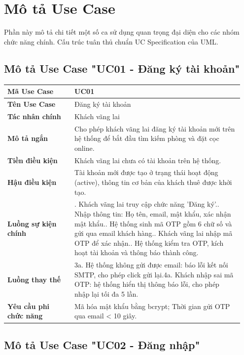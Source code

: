 \section{Mô tả Use Case}

Phần này mô tả chi tiết một số ca sử dụng quan trọng đại diện cho các
nhóm chức năng chính. Cấu trúc tuân thủ chuẩn UC Specification của UML.

\subsection{Mô tả Use Case "UC01 - Đăng ký tài khoản"}

\begin{longtable}[]{@{}>{\RaggedRight\arraybackslash}p{0.27\linewidth}>{\RaggedRight\arraybackslash}p{0.68\linewidth}@{}}
\toprule
\textbf{Mã Use Case} & UC01\tabularnewline
\midrule
\endhead
\textbf{Tên Use Case} & Đăng ký tài khoản\tabularnewline
\textbf{Tác nhân chính} & Khách vãng lai\tabularnewline
\textbf{Mô tả ngắn} & Cho phép khách vãng lai đăng ký tài khoản mới trên
hệ thống để bắt đầu tìm kiếm phòng và đặt cọc online.\tabularnewline
\textbf{Tiền điều kiện} & Khách vãng lai chưa có tài khoản trên hệ
thống.\tabularnewline
\textbf{Hậu điều kiện} & Tài khoản mới được tạo ở trạng thái hoạt động
(active), thông tin cơ bản của khách thuê được khởi tạo.\tabularnewline
\textbf{Luồng sự kiện chính} & 1. Khách vãng lai truy
cập chức năng 'Đăng ký'.\newline 2. Nhập thông tin: Họ tên, email,
mật khẩu, xác nhận mật khẩu.\newline 3. Hệ thống sinh mã OTP gồm 6
chữ số và gửi qua email khách hàng.\newline 4. Khách vãng lai nhập
mã OTP để xác nhận.\newline 5. Hệ thống kiểm tra OTP, kích hoạt tài
khoản và thông báo thành công.\tabularnewline
\textbf{Luồng thay thế} & 3a. Hệ thống không gửi được
email: báo lỗi kết nối SMTP, cho phép click gửi lại.\newline 4a.
Khách nhập sai mã OTP: hệ thống hiển thị thông báo lỗi, cho phép nhập
lại tối đa 5 lần.\tabularnewline
\textbf{Yêu cầu phi chức năng} & Mã hóa mật khẩu bằng bcrypt; Thời gian
gửi OTP qua email \textless{} 10 giây.\tabularnewline
\bottomrule
\end{longtable}

\subsection{Mô tả Use Case "UC02 - Đăng nhập"}

